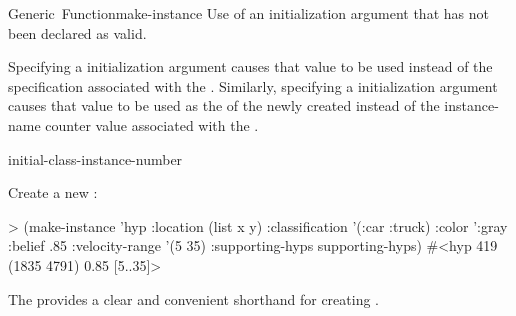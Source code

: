 \documentclass[10pt,twoside,english,pdftex]{article}
\begin{document}
\begin{functiondoc}{Generic~Function}{make-instance}{
     
     
    \returns{} }
\fnerrors
Use of an initialization argument that has not been declared as valid.

%
%
%
\fndescription Specifying a  initialization argument
causes that value to be used instead of the 
specification associated with the . Similarly, specifying a
 initialization argument causes that value to be used as
the  of the newly created  instead
of the instance-name counter value associated with the .

\begin{alsos}{initial-class-instance-number}
\end{alsos}

\fnexample
Create a new  :
%
\W\supp
\begin{example}
> (make-instance 'hyp 
     :location (list x y)
     :classification '(:car :truck)
     :color ':gray
     :belief .85
     :velocity-range '(5 35)
     :supporting-hyps supporting-hyps)
#<hyp 419 (1835 4791) 0.85 [5..35]>
\end{example}

\fnnote 
{}%
The  \textbf{} provides a
clear and convenient shorthand for creating .

\end{functiondoc}

\end{document}
